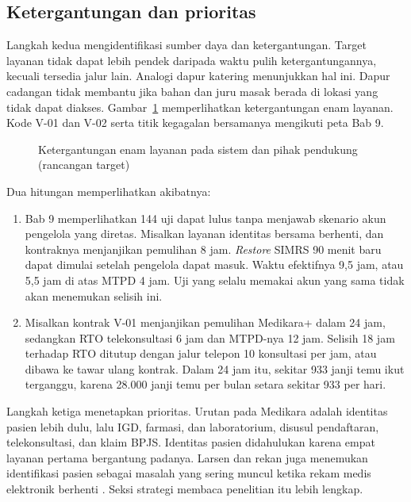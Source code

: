 \subsection*{Ketergantungan dan prioritas}

Langkah kedua mengidentifikasi sumber daya dan ketergantungan. Target layanan tidak dapat lebih
pendek daripada waktu pulih ketergantungannya, kecuali tersedia jalur lain. Analogi dapur katering
menunjukkan hal ini. Dapur cadangan tidak membantu jika bahan dan juru masak berada di lokasi yang
tidak dapat diakses. Gambar~\ref{fig:ch10-ketergantungan} memperlihatkan ketergantungan enam
layanan. Kode V-01 dan V-02 serta titik kegagalan bersamanya mengikuti peta Bab 9.

\begin{figure}[!htb]
  \centering
  
  \caption{Ketergantungan enam layanan pada sistem dan pihak pendukung (rancangan target)}
  \label{fig:ch10-ketergantungan}
\end{figure}

Dua hitungan memperlihatkan akibatnya:
\begin{enumerate}
  \item Bab 9 memperlihatkan 144 uji dapat lulus tanpa menjawab skenario akun pengelola yang
  diretas. Misalkan layanan identitas bersama berhenti, dan kontraknya menjanjikan pemulihan 8
  jam. \textit{Restore} SIMRS 90 menit baru dapat dimulai setelah pengelola dapat masuk. Waktu
  efektifnya 9,5 jam, atau 5,5 jam di atas MTPD 4 jam. Uji yang selalu memakai akun yang sama
  tidak akan menemukan selisih ini.
  \item Misalkan kontrak V-01 menjanjikan pemulihan Medikara+ dalam 24 jam, sedangkan RTO
  telekonsultasi 6 jam dan MTPD-nya 12 jam. Selisih 18 jam terhadap RTO ditutup dengan jalur
  telepon 10 konsultasi per jam, atau dibawa ke tawar ulang kontrak. Dalam 24 jam itu, sekitar
  933 janji temu ikut terganggu, karena 28.000 janji temu per bulan setara sekitar 933 per hari.
\end{enumerate}

Langkah ketiga menetapkan prioritas. Urutan pada Medikara adalah identitas pasien lebih dulu, lalu
IGD, farmasi, dan laboratorium, disusul pendaftaran, telekonsultasi, dan klaim BPJS. Identitas
pasien didahulukan karena empat layanan pertama bergantung padanya. Larsen dan rekan juga menemukan
identifikasi pasien sebagai masalah yang sering muncul ketika rekam medis elektronik berhenti
\cite{c10-larsen2018}. Seksi strategi membaca penelitian itu lebih lengkap.

